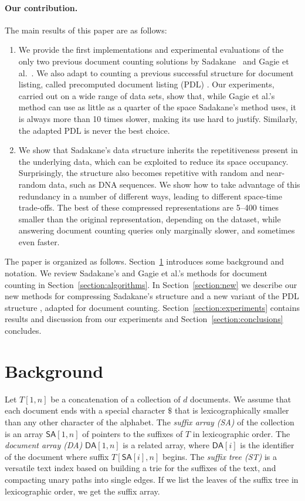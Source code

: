 \documentclass[11pt]{llncs}
\newcommand{\SA}{\ensuremath{\mathsf{SA}}}
\newcommand{\DA}{\ensuremath{\mathsf{DA}}}
\begin{document}
\paragraph{Our contribution.} The main results of this paper are as follows:
\begin{enumerate}
\item We provide the first implementations and experimental evaluations of the only two previous document counting
solutions by Sadakane~\cite{Sad07} and Gagie et al.~\cite{GKNPS13}. We also 
adapt to counting a previous successful structure for document listing, called
precomputed document listing (PDL)
\cite{NPS2014}. Our experiments, carried out on a wide range of data
sets, show that, while Gagie et al.'s method can use as little as a quarter of the space Sadakane's method uses,
it is always more than 10 times slower, making its use hard to justify.
Similarly, the adapted PDL is never the best choice.
\item We show that Sadakane's data structure inherits the repetitiveness present in the underlying data, which can  be exploited to reduce its space occupancy.
Surprisingly, the structure also becomes repetitive with random and near-random data, such as DNA sequences.
We show how to take advantage of this redundancy in a number of 
different ways, leading to different space-time trade-offs.
The best of these compressed representations are 5--400 times smaller than the original representation, depending on the dataset, while answering document counting queries only marginally slower, and sometimes even faster.
\end{enumerate}

The paper is organized as follows. Section~\ref{section:background} introduces some background and notation. We review Sadakane's and Gagie et al.'s methods for document counting in Section~\ref{section:algorithms}. In Section~\ref{section:new} we describe our new methods for compressing Sadakane's structure and a new variant of the PDL structure \cite{NPS2014}, adapted for document counting. Section~\ref{section:experiments} contains results and discussion from our experiments and Section~\ref{section:conclusions} concludes.

\section{Background}\label{section:background}

Let $T[1,n]$ be a concatenation of a collection of $d$ documents. We assume that each document ends with a special character $\$$ that is lexicographically smaller than any other character of the alphabet. The \emph{suffix array (SA)} of the collection is an array $\SA[1,n]$ of pointers to the suffixes of $T$ in lexicographic order. The \emph{document array (DA)} $\DA[1,n]$ is a related array, where $\DA[i]$ is the identifier of the document where suffix $T[\SA[i],n]$ begins. The \emph{suffix tree (ST)} is a versatile text index based on building a trie for the suffixes of the text, and compacting unary paths into single edges. If we list the leaves of the suffix tree in lexicographic order, we get the suffix array.
\end{document}
